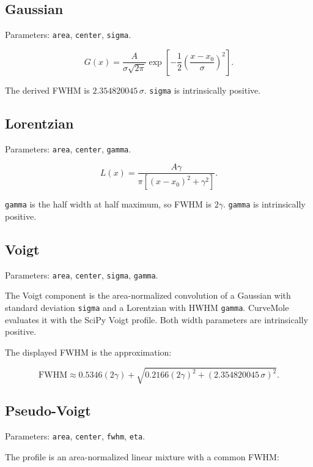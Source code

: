 \documentclass[
  10pt,
  a4paper,
  oneside]{scrreprt}
\begin{document}
\hypertarget{gaussian}{%
\subsection{Gaussian}\label{gaussian}}

Parameters: \texttt{area}, \texttt{center}, \texttt{sigma}.

\[
G(x)=\frac{A}{\sigma\sqrt{2\pi}}
\exp\left[-\frac{1}{2}\left(\frac{x-x_0}{\sigma}\right)^2\right].
\]

The derived FWHM is \(2.354820045\,\sigma\). \texttt{sigma} is
intrinsically positive.

\hypertarget{lorentzian}{%
\subsection{Lorentzian}\label{lorentzian}}

Parameters: \texttt{area}, \texttt{center}, \texttt{gamma}.

\[
L(x)=\frac{A\gamma}{\pi[(x-x_0)^2+\gamma^2]}.
\]

\texttt{gamma} is the half width at half maximum, so FWHM is
\(2\gamma\). \texttt{gamma} is intrinsically positive.

\hypertarget{voigt}{%
\subsection{Voigt}\label{voigt}}

Parameters: \texttt{area}, \texttt{center}, \texttt{sigma},
\texttt{gamma}.

The Voigt component is the area-normalized convolution of a Gaussian
with standard deviation \texttt{sigma} and a Lorentzian with HWHM
\texttt{gamma}. CurveMole evaluates it with the SciPy Voigt profile.
Both width parameters are intrinsically positive.

The displayed FWHM is the approximation:

\[
\mathrm{FWHM}\approx 0.5346(2\gamma)+
\sqrt{0.2166(2\gamma)^2+(2.354820045\,\sigma)^2}.
\]

\hypertarget{pseudo-voigt}{%
\subsection{Pseudo-Voigt}\label{pseudo-voigt}}

Parameters: \texttt{area}, \texttt{center}, \texttt{fwhm}, \texttt{eta}.

The profile is an area-normalized linear mixture with a common FWHM:
\end{document}
